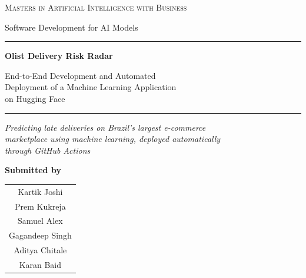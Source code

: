 \documentclass[11pt,a4paper]{report}
\begin{document}
\begin{titlepage}
\thispagestyle{empty}
\centering
\setlength{\parskip}{0pt}

\vspace*{0.2cm}

{\large\scshape Masters in Artificial Intelligence with Business\par}
\vspace{0.20cm}
{\normalsize Software Development for AI Models\par}

\vspace{0.75cm}
\rule{\textwidth}{1.1pt}
\vspace{0.45cm}

{\huge\bfseries Olist Delivery Risk Radar\par}
\vspace{0.40cm}
{\Large End-to-End Development and Automated\\[0.15cm]
Deployment of a Machine Learning Application\\[0.15cm]
on Hugging Face\par}

\vspace{0.42cm}
\rule{\textwidth}{1.1pt}

\vspace{0.60cm}
{\normalsize\itshape Predicting late deliveries on Brazil's largest e-commerce\\[0.10cm]
marketplace using machine learning, deployed automatically\\[0.10cm]
through GitHub Actions\par}

\vspace{0.85cm}

{\large\bfseries Submitted by\par}
\vspace{0.35cm}
{\normalsize
\begin{tabular}{c}
Kartik Joshi \\[0.16cm]
Prem Kukreja \\[0.16cm]
Samuel Alex \\[0.16cm]
Gagandeep Singh \\[0.16cm]
Aditya Chitale \\[0.16cm]
Karan Baid \\
\end{tabular}\par}


\end{titlepage}
\end{document}
